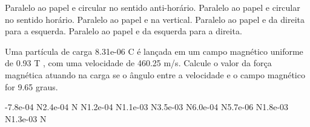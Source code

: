 \documentclass[12pt, addpoints]{exam}
\begin{document}
\begin{questions}
\begin{multicols*}{2}
        

\begin{choices}
\choice Paralelo ao papel e circular no sentido anti-horário. 
\choice Paralelo ao papel e circular no sentido horário. 
\choice Paralelo ao papel e na vertical. 
\choice Paralelo ao papel e da direita para a esquerda. 
\choice Paralelo ao papel e da esquerda para a direita. 
\end{choices}
\question Uma partícula de carga 8.31e-06 C é lançada em um campo magnético uniforme de    0.93 T , com uma velocidade de 460.25 m/s. Calcule o valor da força magnética atuando na carga se o ângulo entre a velocidade e o campo magnético for    9.65 graus.

\begin{oneparchoices}
\choice -7.8e-04 N\choice 2.4e-04 N N\choice 1.2e-04 N\choice 1.1e-03 N\choice 3.5e-03 N\choice 6.0e-04 N\choice 5.7e-06 N\choice 1.8e-03 N\choice 1.3e-03 N
\end{oneparchoices}\end{multicols*}
\end{questions}
\newpage
\end{document}
